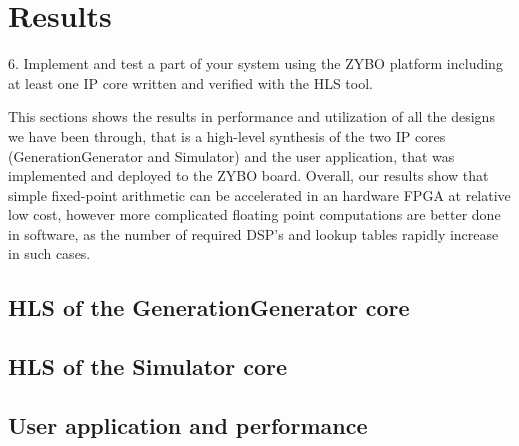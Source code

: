 \section{Results}\label{sec:results}
\begin{framed}
6. Implement and test a part of your system using the ZYBO platform including at least one IP core written and verified with the HLS tool.
\end{framed}

This sections shows the results in performance and utilization of all the designs we have been through, that is a high-level synthesis of the two IP cores (GenerationGenerator and Simulator) and the user application, that was implemented and deployed to the ZYBO board. Overall, our results show that simple fixed-point arithmetic can be accelerated in an hardware FPGA at relative low cost, however more complicated floating point computations are better done in software, as the number of required DSP's and lookup tables rapidly increase in such cases.

\subsection{HLS of the GenerationGenerator core}
\subsection{HLS of the Simulator core}
\subsection{User application and performance}




